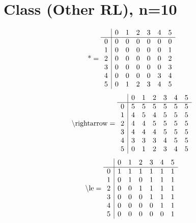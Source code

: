 \documentclass[11pt]{article}
\begin{document}
\section{Class (Other RL), n=10}
\[\text{*} = 
\begin{array}{r | r r r r r r}
 & 0 & 1 & 2 & 3 & 4 & 5 \\ \hline
0 & 0 & 0 & 0 & 0 & 0 & 0 \\
1 & 0 & 0 & 0 & 0 & 0 & 1 \\
2 & 0 & 0 & 0 & 0 & 0 & 2 \\
3 & 0 & 0 & 0 & 0 & 0 & 3 \\
4 & 0 & 0 & 0 & 0 & 3 & 4 \\
5 & 0 & 1 & 2 & 3 & 4 & 5 \\
\end{array}
\]
\[\text{\textbackslash rightarrow} = 
\begin{array}{r | r r r r r r}
 & 0 & 1 & 2 & 3 & 4 & 5 \\ \hline
0 & 5 & 5 & 5 & 5 & 5 & 5 \\
1 & 4 & 5 & 4 & 5 & 5 & 5 \\
2 & 4 & 4 & 5 & 5 & 5 & 5 \\
3 & 4 & 4 & 4 & 5 & 5 & 5 \\
4 & 3 & 3 & 3 & 4 & 5 & 5 \\
5 & 0 & 1 & 2 & 3 & 4 & 5 \\
\end{array}
\]
\[\text{\textbackslash le} = 
\begin{array}{r | r r r r r r}
 & 0 & 1 & 2 & 3 & 4 & 5 \\ \hline
0 & 1 & 1 & 1 & 1 & 1 & 1 \\
1 & 0 & 1 & 0 & 1 & 1 & 1 \\
2 & 0 & 0 & 1 & 1 & 1 & 1 \\
3 & 0 & 0 & 0 & 1 & 1 & 1 \\
4 & 0 & 0 & 0 & 0 & 1 & 1 \\
5 & 0 & 0 & 0 & 0 & 0 & 1 \\
\end{array}
\]
\end{document}
